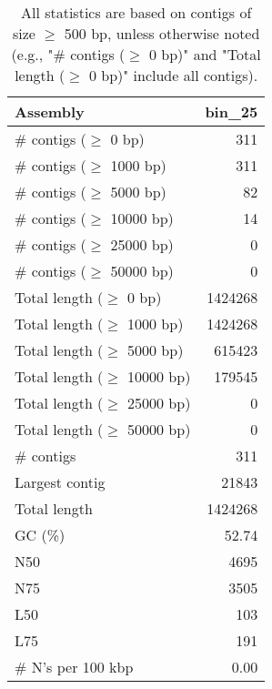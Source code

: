 \documentclass[12pt,a4paper]{article}
\begin{document}
\begin{table}[ht]
\begin{center}
\caption{All statistics are based on contigs of size $\geq$ 500 bp, unless otherwise noted (e.g., "\# contigs ($\geq$ 0 bp)" and "Total length ($\geq$ 0 bp)" include all contigs).}
\begin{tabular}{|l*{1}{|r}|}
\hline
Assembly & bin\_25 \\ \hline
\# contigs ($\geq$ 0 bp) & 311 \\ \hline
\# contigs ($\geq$ 1000 bp) & 311 \\ \hline
\# contigs ($\geq$ 5000 bp) & 82 \\ \hline
\# contigs ($\geq$ 10000 bp) & 14 \\ \hline
\# contigs ($\geq$ 25000 bp) & 0 \\ \hline
\# contigs ($\geq$ 50000 bp) & 0 \\ \hline
Total length ($\geq$ 0 bp) & 1424268 \\ \hline
Total length ($\geq$ 1000 bp) & 1424268 \\ \hline
Total length ($\geq$ 5000 bp) & 615423 \\ \hline
Total length ($\geq$ 10000 bp) & 179545 \\ \hline
Total length ($\geq$ 25000 bp) & 0 \\ \hline
Total length ($\geq$ 50000 bp) & 0 \\ \hline
\# contigs & 311 \\ \hline
Largest contig & 21843 \\ \hline
Total length & 1424268 \\ \hline
GC (\%) & 52.74 \\ \hline
N50 & 4695 \\ \hline
N75 & 3505 \\ \hline
L50 & 103 \\ \hline
L75 & 191 \\ \hline
\# N's per 100 kbp & 0.00 \\ \hline
\end{tabular}
\end{center}
\end{table}
\end{document}
